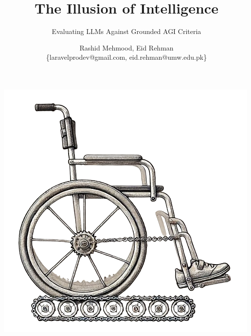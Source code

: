 \documentclass[11pt]{scrartcl}
\begin{document}
\title{The Illusion of Intelligence}
\subtitle{Evaluating LLMs Against Grounded AGI Criteria}
\author{Rashid Mehmood, Eid Rehman \\ \{laravelprodev@gmail.com, eid.rehman@umw.edu.pk\} }

\maketitle

\includegraphics[scale=0.6, center]{title_wheelchair.png}

\vspace{4cm}
\end{document}

